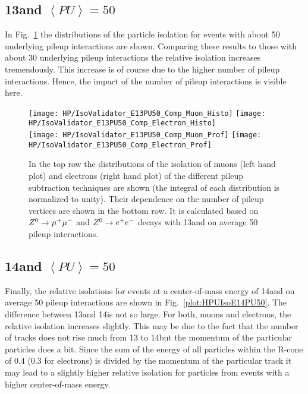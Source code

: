 \subsection{13\TeV and $\left<PU\right>=50$ \label{sec:HPUIsoE13PU50}}

In Fig.~\ref{plot:HPUIsoE13PU50} the distributions of the particle isolation for events with about 50 underlying pileup interactions are shown. Comparing these results to those with about 30 underlying pileup interactions the relative isolation increases tremendously. This increase is of course due to the higher number of pileup interactions. Hence, the impact of the number of pileup interactions is visible here.

\begin{figure}[h!t]
  \centering
  \texttt{[image: HP/IsoValidator\_E13PU50\_Comp\_Muon\_Histo]}
  \texttt{[image: HP/IsoValidator\_E13PU50\_Comp\_Electron\_Histo]}
  \\
  \texttt{[image: HP/IsoValidator\_E13PU50\_Comp\_Muon\_Prof]}
  \texttt{[image: HP/IsoValidator\_E13PU50\_Comp\_Electron\_Prof]}
  \caption[Distribution of the isolation of muons and electrons and their dependence on the number of pileup vertices for events with 13\TeV and PU=50]{In the top row the distributions of the isolation of muons (left hand plot) and electrons (right hand plot) of the different pileup subtraction techniques are shown (the integral of each distribution is normalized to unity). Their dependence on the number of pileup vertices are shown in the bottom row. It is calculated based on ${Z^{0}}\rightarrow\mu^+\mu^-$ and ${Z^{0}}\rightarrow e^+e^-$ decays with 13\TeV and on average 50 pileup interactions.\label{plot:HPUIsoE13PU50}}
\end{figure}

\subsection{14\TeV and $\left<PU\right>=50$ \label{sec:HPUIsoE14PU50}}

Finally, the relative isolations for events at a center-of-mass energy of 14\TeV and on average 50 pileup interactions are shown in Fig.~\ref{plot:HPUIsoE14PU50}. The difference between 13\TeV and 14\TeV is not so large. For both, muons and electrons, the relative isolation increases slightly. This may be due to the fact that the number of tracks does not rise much from 13 to 14\TeV but the momentum of the particular particles does a bit. Since the sum of the energy of all particles within the R-cone of 0.4 (0.3 for electrons) is divided by the momentum of the particular track it may lead to a slightly higher relative isolation for particles from events with a higher center-of-mass energy.

